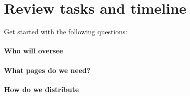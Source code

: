     \section{Review tasks and timeline} \label{sec:wiki-planning}
    Get started with the following questions:
    \paragraph{Who will oversee}
    \paragraph{What pages do we need?}
    \paragraph{How do we distribute}


